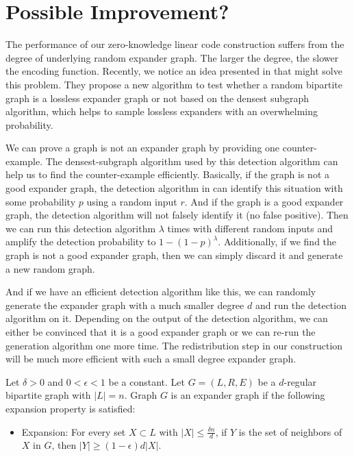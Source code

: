 \section{Possible Improvement?}

The performance of our zero-knowledge linear code construction suffers from the degree of underlying random expander graph. The larger the degree, the slower the encoding function. Recently, we notice an idea presented in \cite{orion} that might solve this problem. They propose a new algorithm to test whether a random bipartite graph is a lossless expander graph or not based on the densest subgraph algorithm, which helps to sample lossless expanders with an overwhelming probability.

We can prove a graph is not an expander graph by providing one counter-example. The densest-subgraph algorithm used by this detection algorithm can help us to find the counter-example efficiently.
Basically, if the graph is not a good expander graph, the detection algorithm in \cite{orion} can identify this situation with some probability $p$ using a random input $r$. And if the graph is a good expander graph, the detection algorithm will not falsely identify it (no false positive). Then we can run this detection algorithm $\lambda$ times with different random inputs and amplify the detection probability to $1 - (1 - p)^\lambda$. Additionally, if we find the graph is not a good expander graph, then we can simply discard it and generate a new random graph.


And if we have an efficient detection algorithm like this, we can randomly generate the expander graph with a much smaller degree $d$ and run the detection algorithm on it. Depending on the output of the detection algorithm, we can either be convinced that it is a good expander graph or we can re-run the generation algorithm one more time. The redistribution step in our construction will be much more efficient with such a small degree expander graph.


\begin{definition}
\label{definition:randomgraph2}

Let $\delta > 0$ and $0 < \epsilon < 1$ be a constant. Let $G=(L, R, E)$ be a $d$-regular bipartite graph with $|L| = n$. Graph $G$ is an expander graph if the following expansion property is satisfied:

    \begin{itemize}
        \item Expansion: For every set $X \subset L$ with $|X| \le \frac{\delta n}{d}$, if $Y$ is the set of neighbors of $X$ in $G$, then $|Y| \ge (1 - \epsilon) d |X|$.
    \end{itemize}

\end{definition}

